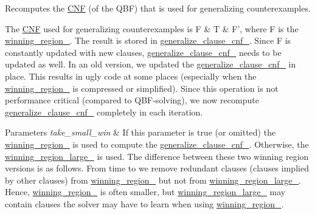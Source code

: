 Recomputes the \hyperlink{classCNF}{C\-N\-F} (of the Q\-B\-F) that is used for generalizing counterexamples. 

The \hyperlink{classCNF}{C\-N\-F} used for generalizing counterexamples is F \& T \& F', where F is the \hyperlink{classLearnSynthQBF_a9c6b41f7df5f4ed4bfc5930136fc1152}{winning\-\_\-region\-\_\-}. The result is stored in \hyperlink{classLearnSynthQBF_adb0678a7c034958c31bd5d92615e9859}{generalize\-\_\-clause\-\_\-cnf\-\_\-}. Since F is constantly updated with new clauses, \hyperlink{classLearnSynthQBF_adb0678a7c034958c31bd5d92615e9859}{generalize\-\_\-clause\-\_\-cnf\-\_\-} needs to be updated as well. In an old version, we updated the \hyperlink{classLearnSynthQBF_adb0678a7c034958c31bd5d92615e9859}{generalize\-\_\-clause\-\_\-cnf\-\_\-} in place. This results in ugly code at some places (especially when the \hyperlink{classLearnSynthQBF_a9c6b41f7df5f4ed4bfc5930136fc1152}{winning\-\_\-region\-\_\-} is compressed or simplified). Since this operation is not performance critical (compared to Q\-B\-F-\/solving), we now recompute \hyperlink{classLearnSynthQBF_adb0678a7c034958c31bd5d92615e9859}{generalize\-\_\-clause\-\_\-cnf\-\_\-} completely in each iteration.


\begin{DoxyParams}{Parameters}
{\em take\-\_\-small\-\_\-win} & If this parameter is true (or omitted) the \hyperlink{classLearnSynthQBF_a9c6b41f7df5f4ed4bfc5930136fc1152}{winning\-\_\-region\-\_\-} is used to compute the \hyperlink{classLearnSynthQBF_adb0678a7c034958c31bd5d92615e9859}{generalize\-\_\-clause\-\_\-cnf\-\_\-}. Otherwise, the \hyperlink{classLearnSynthQBF_aa9b460cdc140c3969a32ea77982181d2}{winning\-\_\-region\-\_\-large\-\_\-} is used. The difference between these two winning region versions is as follows. From time to we remove redundant clauses (clauses implied by other clauses) from \hyperlink{classLearnSynthQBF_a9c6b41f7df5f4ed4bfc5930136fc1152}{winning\-\_\-region\-\_\-} but not from \hyperlink{classLearnSynthQBF_aa9b460cdc140c3969a32ea77982181d2}{winning\-\_\-region\-\_\-large\-\_\-}. Hence, \hyperlink{classLearnSynthQBF_a9c6b41f7df5f4ed4bfc5930136fc1152}{winning\-\_\-region\-\_\-} is often smaller, but \hyperlink{classLearnSynthQBF_aa9b460cdc140c3969a32ea77982181d2}{winning\-\_\-region\-\_\-large\-\_\-} may contain clauses the solver may have to learn when using \hyperlink{classLearnSynthQBF_a9c6b41f7df5f4ed4bfc5930136fc1152}{winning\-\_\-region\-\_\-}. \\
\hline
\end{DoxyParams}


